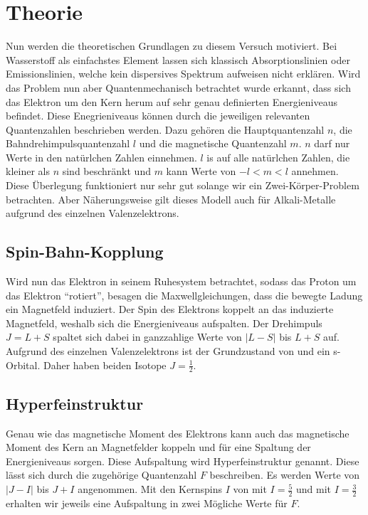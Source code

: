 \chapter{Theorie}
\label{cha:Theorie}
Nun werden die theoretischen Grundlagen zu diesem Versuch motiviert. Bei Wasserstoff als einfachstes Element lassen sich klassisch Absorptionslinien oder Emissionslinien,
welche kein dispersives Spektrum aufweisen nicht erklären. Wird das Problem nun aber Quantenmechanisch betrachtet wurde erkannt, dass sich das Elektron um den Kern herum auf sehr genau 
definierten Energieniveaus befindet. Diese Enegrieniveaus können durch die jeweiligen relevanten Quantenzahlen beschrieben werden. Dazu gehören die Hauptquantenzahl $n$,
die Bahndrehimpulsquantenzahl $l$ und die magnetische Quantenzahl $m$. $n$ darf nur Werte in den natürlchen Zahlen einnehmen. $l$ is auf alle natürlchen Zahlen, die kleiner als $n$
sind beschränkt und $m$ kann Werte von $-l < m < l$ annehmen. Diese Überlegung funktioniert nur sehr gut solange wir ein Zwei-Körper-Problem betrachten. Aber Näherungsweise gilt dieses 
Modell auch für Alkali-Metalle aufgrund des einzelnen Valenzelektrons.

\section{Spin-Bahn-Kopplung}
\label{sec:soc}
Wird nun das Elektron in seinem Ruhesystem betrachtet, sodass das Proton um das Elektron \enquote{rotiert}, besagen die Maxwellgleichungen, dass die bewegte Ladung ein Magnetfeld 
induziert. Der Spin des Elektrons koppelt an das induzierte Magnetfeld, weshalb sich die Energieniveaus aufspalten. Der Drehimpuls $J = L + S$ spaltet sich dabei 
in ganzzahlige Werte von $|L-S|$ bis $L+S$ auf. Aufgrund des einzelnen Valenzelektrons ist der Grundzustand von  und  ein s-Orbital. Daher haben beiden Isotope 
$J = \frac{1}{2}$.

\section{Hyperfeinstruktur}
\label{sec:hfs}
Genau wie das magnetische Moment des Elektrons kann auch das magnetische Moment des Kern an Magnetfelder koppeln und für eine Spaltung der Energieniveaus sorgen. Diese Aufspaltung wird 
Hyperfeinstruktur genannt. Diese lässt sich durch die zugehörige Quantenzahl $F$ beschreiben. Es werden Werte von $|J-I|$ bis $J+I$ angenommen. Mit den Kernspins $I$ von 
 mit $I = \frac{5}{2}$ und  mit $I = \frac{3}{2}$ erhalten wir jeweils eine Aufspaltung in zwei Mögliche Werte für $F$.

